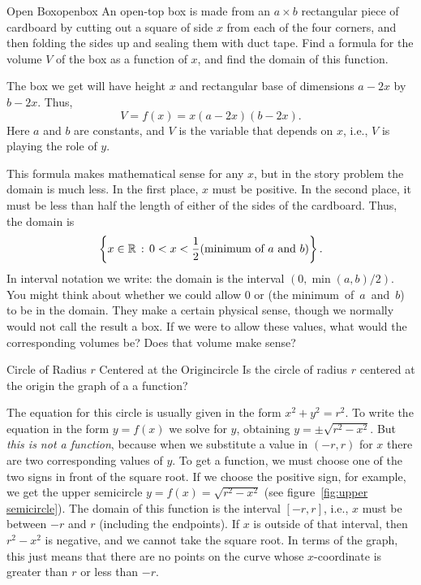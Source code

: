 \begin{example}{Open Box}{openbox} 
An open-top box is made from an $a\times b$ rectangular piece of
cardboard by cutting out a square of side $x$ from each of the four
corners, and then folding the sides up and sealing them with duct
tape.  Find a formula for the volume $V$ of the box as a function of
$x$, and find the domain of this function.
\end{example}

\begin{solution} 
The box we get will have height $x$ and rectangular base of
dimensions $a-2x$ by $b-2x$.  Thus, 
$$V=f(x)=x(a-2x)(b-2x).$$
Here $a$ and $b$ are constants, and $V$ is the variable that depends
on $x$, i.e., $V$ is playing the role of $y$.  

This formula makes mathematical sense for any $x$, but in the story
problem the domain is much less.  In the first place, $x$ must be
positive.  In the second place, it must be less than half the length
of either of the sides of the cardboard.  Thus, the domain is
$$\left\{x\in\mathbb{R}\,:\,0<x<{\frac{1}{2}}(\hbox{minimum~of~$a$~and~$b$})\right\}.$$
In interval notation we write: the domain is the interval
$(0,\min(a,b)/2)$. You might think about whether we could allow 0 or 
(the minimum~of~$a$~and~$b$) to be in the domain. They make a certain
physical sense, though we normally would not call the result a box. If we
were to allow these values, what would the corresponding volumes be?
Does that volume make sense?
\end{solution}

\begin{example}{Circle of Radius $r$ Centered at the Origin}{circle}
Is the circle of radius $r$ centered at the origin the graph of a a function?
\end{example}

\begin{solution} 
The equation for this circle is usually given in the form
$x^2+y^2=r^2$.  To write the equation in the form $y=f(x)$ we solve
for $y$, obtaining $y=\pm\sqrt{r^2-x^2}$.  But {\it this is not a
function}, because when we substitute a value in $(-r,r)$ for $x$
there are two corresponding values of $y$.  To get a function, we must
choose one of the two signs in front of the square root.  If we choose
the positive sign, for example, we get the upper semicircle
$y=f(x)=\sqrt{r^2- x^2}$ (see figure~\ref{fig:upper semicircle}).  The
domain of this function is the interval $[-r,r]$, i.e., $x$ must be
between $-r$ and $r$ (including the endpoints).  If $x$ is outside of
that interval, then $r^2-x^2$ is negative, and we cannot take the
square root.  In terms of the graph, this just means that there are no
points on the curve whose $x$-coordinate is greater than $r$ or less
than $-r$.
\end{solution}

